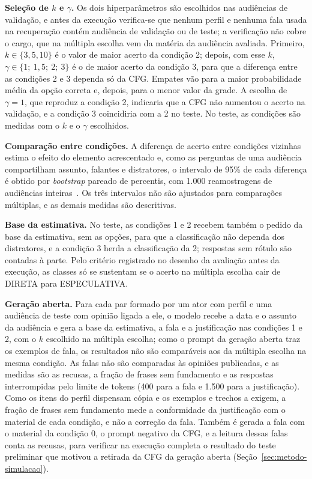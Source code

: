 \textbf{Seleção de $k$ e $\gamma$.} Os dois hiperparâmetros são escolhidos nas audiências de
validação, e antes da execução verifica-se que nenhum perfil e nenhuma fala usada na recuperação
contém audiência de validação ou de teste; a verificação não cobre o cargo, que na múltipla escolha
vem da matéria da audiência avaliada. Primeiro, $k \in \{3, 5, 10\}$ é o valor de maior acerto da
condição 2; depois, com esse $k$, $\gamma \in \{1;\ 1{,}5;\ 2;\ 3\}$ é o de maior acerto da condição 3,
para que a diferença entre as condições 2 e 3 dependa só da CFG. Empates vão para a maior
probabilidade média da opção correta e, depois, para o menor valor da grade. A escolha de
$\gamma = 1$, que reproduz a condição 2, indicaria que a CFG não aumentou o acerto na validação, e a
condição 3 coincidiria com a 2 no teste. No teste, as condições são medidas com o $k$ e o $\gamma$
escolhidos.

\textbf{Comparação entre condições.} A diferença de acerto entre condições vizinhas estima o efeito
do elemento acrescentado e, como as perguntas de uma audiência compartilham assunto, falantes e
distratores, o intervalo de 95\% de cada diferença é obtido por \textit{bootstrap} pareado de
percentis, com 1.000 reamostragens de audiências inteiras~\citep{efron1993introduction}. Os três
intervalos não são ajustados para comparações múltiplas, e as demais medidas são descritivas.

\textbf{Base da estimativa.} No teste, as condições 1 e 2 recebem também o pedido da base da
estimativa, sem as opções, para que a classificação não dependa dos distratores, e a condição 3
herda a classificação da 2; respostas sem rótulo são contadas à parte. Pelo critério registrado no
desenho da avaliação antes da execução, as classes só se sustentam se o acerto na múltipla escolha
cair de DIRETA para ESPECULATIVA.

\textbf{Geração aberta.} Para cada par formado por um ator com perfil e uma audiência de teste com
opinião ligada a ele, o modelo recebe a data e o assunto da audiência e gera a base da estimativa, a
fala e a justificação nas condições 1 e 2, com o $k$ escolhido na múltipla escolha; como o prompt da
geração aberta traz os exemplos de fala, os resultados não são comparáveis aos da múltipla escolha na
mesma condição. As falas não são comparadas às opiniões
publicadas, e as medidas são as recusas, a fração de frases sem fundamento e as respostas
interrompidas pelo limite de tokens (400 para a fala e 1.500 para a justificação). Como os itens do
perfil dispensam cópia e os exemplos e trechos a exigem, a fração de frases sem fundamento mede a
conformidade da justificação com o material de cada condição, e não a correção da fala. Também é
gerada a fala com o material da condição 0, o prompt negativo da CFG, e a leitura dessas falas conta
as recusas, para verificar na execução completa o resultado do teste preliminar que motivou a
retirada da CFG da geração aberta (Seção~\ref{sec:metodo-simulacao}).

